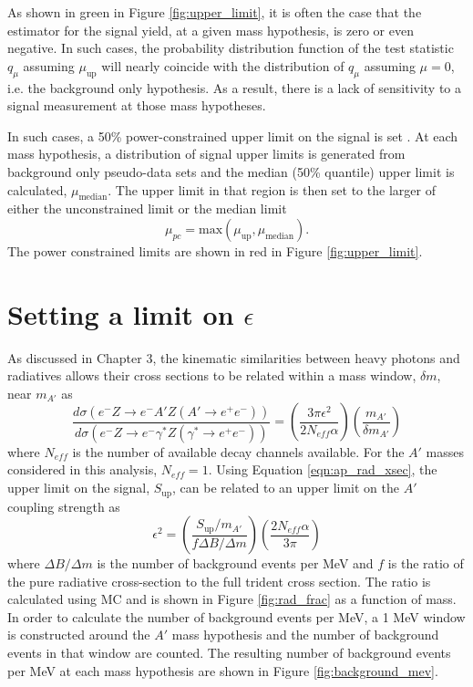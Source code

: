 As shown in green in Figure \ref{fig:upper_limit}, it is often the case that the
estimator for the signal yield, at a given mass hypothesis, is zero or
even negative.  In such cases, the probability distribution function of the
test statistic $q_{\mu}$ assuming $\mu_{\text{up}}$ will nearly coincide with 
the distribution of $q_{\mu}$ assuming $\mu = 0$, i.e. the background only 
hypothesis.  As a result, there is a lack of 
sensitivity to a signal measurement at those mass hypotheses.

In such cases, a 50\% power-constrained upper limit on the signal is set
\cite{Cowan:2011an}.
At each mass hypothesis, a distribution of signal upper limits is generated from
background only pseudo-data sets and the median (50\% quantile) upper limit
is calculated, $\mu_{\mbox{median}}$. The upper limit in that region is then set to 
the larger of either the unconstrained limit or the median limit
\begin{equation}
    \mu_{pc} = \mbox{max}(\mu_{\text{up}}, \mu_{\text{median}}).
\end{equation}
The power constrained limits are shown in red in Figure \ref{fig:upper_limit}.

\section{Setting a limit on $\epsilon$}

As discussed in Chapter 3, the kinematic similarities between heavy photons and 
radiatives allows their cross sections to be related within a mass window, 
$\delta m$, near $m_{A'}$ as 
\begin{equation}
    \frac{d\sigma(e^-Z \rightarrow e^-A'Z(A' \rightarrow e^+e^-))}{
    d\sigma(e^-Z \rightarrow e^-\gamma^*Z(\gamma^* \rightarrow e^+e^-))} = 
    \left( \frac{3 \pi \epsilon^2}{2 N_{eff} \alpha} \right)
        \left( \frac{m_{A'}}{\delta m_{A'}} \right)
    \label{eqn:ap_rad_xsec}
\end{equation}
where $N_{eff}$ is the number of available decay channels available.  For the 
$A'$ masses considered in this analysis, $N_{eff} = 1$. Using Equation 
\ref{eqn:ap_rad_xsec}, the upper limit on the signal, $S_{\text{up}}$, can be related to an
upper limit on the $A'$ coupling strength as 
\begin{equation}
    \epsilon^2 = \left (\frac{S_{\text{up}}/m_{A'}}{
                f\Delta B/\Delta m} \right) 
                \left(\frac{2 N_{eff} \alpha}{3 \pi} \right)
    \label{eqn:eps}
\end{equation}
where $\Delta B/\Delta m$ is the number of 
background events per MeV and $f$ is the ratio of the pure radiative cross-section to the full trident 
cross section.  The ratio is calculated using MC and is shown in Figure \ref{fig:rad_frac} as 
a function of mass.
In order to calculate the number of background 
events per MeV, a 1 MeV window is constructed around the $A'$ mass hypothesis
and the number of background events in that window are counted.  The resulting 
number of background events per MeV at each mass hypothesis are shown in Figure 
\ref{fig:background_mev}.  

